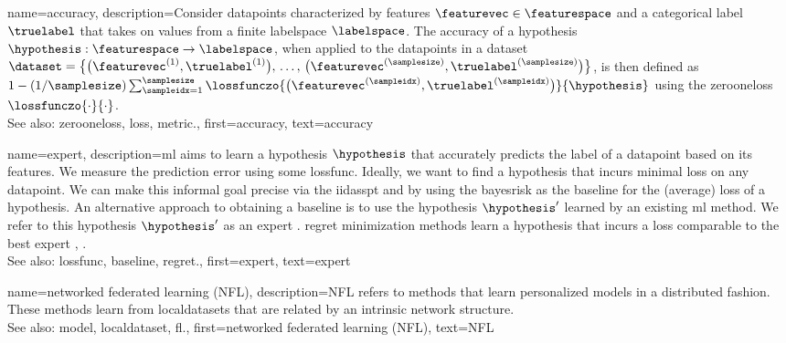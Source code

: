 {name={accuracy},
	description={Consider \glspl{datapoint} characterized by \glspl{feature} $\featurevec \in \featurespace$ and 
		a categorical \gls{label} $\truelabel$ that takes on values from a finite \gls{labelspace} $\labelspace$. The 
		accuracy of a \gls{hypothesis} $\hypothesis: \featurespace \rightarrow \labelspace$, when applied to the \glspl{datapoint} in a \gls{dataset} 
		$\dataset = \big\{ \big(\featurevec^{(1)}, \truelabel^{(1)} \big), \,\ldots, \,\big(\featurevec^{(\samplesize)},\truelabel^{(\samplesize)}\big) \big\}$, 
		is then defined as $1 - (1/\samplesize)\sum_{\sampleidx=1}^{\samplesize} \lossfunczo{\big(\featurevec^{(\sampleidx)},\truelabel^{(\sampleidx)}\big)}{\hypothesis}$ 
		using the \gls{zerooneloss} $\lossfunczo{\cdot}{\cdot}$.
					\\ 
		See also: \gls{zerooneloss}, \gls{loss}, \gls{metric}.},
	first={accuracy},
	text={accuracy} 
}


{name={expert},
	description={\gls{ml} aims to learn a \gls{hypothesis} $\hypothesis$ that accurately predicts the \gls{label} 
		of a \gls{datapoint} based on its \glspl{feature}. We measure the \gls{prediction} error using 
		some \gls{lossfunc}. Ideally, we want to find a \gls{hypothesis} that incurs minimal \gls{loss} 
		on any \gls{datapoint}. We can make this informal goal precise via the \gls{iidasspt} 
		and by using the \gls{bayesrisk} as the \gls{baseline} for the (average) \gls{loss} of a \gls{hypothesis}. 
		An alternative approach to obtaining a \gls{baseline} is to use the \gls{hypothesis} $\hypothesis'$ learned 
		by an existing \gls{ml} method. We refer to this \gls{hypothesis} $\hypothesis'$ as an expert \cite{PredictionLearningGames}. 
		\Gls{regret} minimization methods learn a \gls{hypothesis}
		that incurs a \gls{loss} comparable to the best expert \cite{PredictionLearningGames}, \cite{HazanOCO}.
					\\ 
		See also: \gls{lossfunc}, \gls{baseline}, \gls{regret}.},
	first={expert},
	text={expert} 
}

{name={networked federated learning (NFL)},
	description={NFL refers 
		to methods that learn personalized \glspl{model} in a distributed fashion. These methods learn from \glspl{localdataset} 
		that are related by an intrinsic network structure.
					\\ 
		See also: \gls{model}, \gls{localdataset}, \gls{fl}.},
	first={networked federated learning (NFL)},
	text={NFL} 
}


